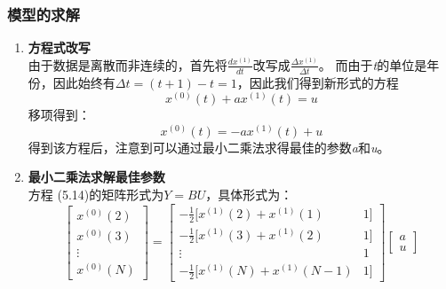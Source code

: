 \documentclass[a4paper, 12pt]{article}
\numberwithin{equation}{section}
\begin{document}
                \subsubsection{模型的求解}
                    \begin{enumerate}[(1)]
                        \item \textbf{方程式改写} \\
                            由于数据是离散而非连续的，首先将$ \frac{dx^{ (1)}}{dt} $改写成$ \frac{\Delta x^{ (1)}}{\Delta t} $。
                            而由于\textit{t}的单位是年份，因此始终有$ \Delta t = (t + 1) - t = 1 $，因此我们得到新形式的方程 \\
                            \[ x^{ (0)} (t) + ax^{ (1)} (t) = u \]
                            移项得到：
                            \begin{equation}
                                x^{ (0)} (t) = -ax^{ (1)} (t) + u
                            \end{equation}
                            得到该方程后，注意到可以通过最小二乘法求得最佳的参数\textit{a}和\textit{u}。


                        \item \textbf{最小二乘法求解最佳参数} \\
                            方程 (5.14)的矩阵形式为$ Y = BU $，具体形式为：
                            \begin{equation}
                                \begin{bmatrix}
                                    x^{ (0)} (2) \\
                                    x^{ (0)} (3) \\
                                    \vdots \\
                                    x^{ (0)} (N)
                                \end{bmatrix}
                                =
                                \begin{bmatrix}
                                    -\frac{1}{2} [ x^{ (1)} (2) + x^{ (1)} (1) & 1] \\
                                    -\frac{1}{2} [ x^{ (1)} (3) + x^{ (1)} (2) & 1] \\
                                    \vdots & 1 \\
                                    -\frac{1}{2} [ x^{ (1)} (N) + x^{ (1)} (N - 1) & 1]
                                \end{bmatrix}
                                \begin{bmatrix}
                                    a \\
                                    u
                                \end{bmatrix}
                            \end{equation}


\end{enumerate}
\end{document}
